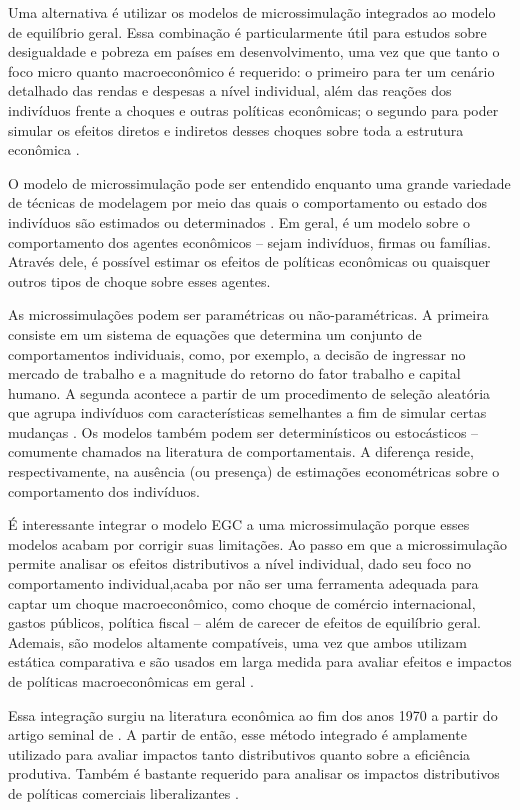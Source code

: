 Uma alternativa é utilizar os modelos de microssimulação integrados ao modelo de equilíbrio geral. Essa combinação é particularmente útil para estudos sobre desigualdade e pobreza em países em desenvolvimento, uma vez que que tanto o foco micro quanto macroeconômico é requerido: o primeiro para ter um cenário detalhado das rendas e despesas a nível individual, além das reações dos indivíduos frente a choques e outras políticas econômicas; o segundo para poder simular os efeitos diretos e indiretos desses choques sobre toda a estrutura econômica \cite{tiberti17, klevmarken22}.

O modelo de microssimulação pode ser entendido enquanto uma grande variedade de técnicas de modelagem por meio das quais o comportamento ou estado dos indivíduos são estimados ou determinados \cite{figari15}. Em geral, é um modelo sobre o comportamento dos agentes econômicos -- sejam indivíduos, firmas ou famílias. Através dele, é possível estimar os efeitos de políticas econômicas ou quaisquer outros tipos de choque sobre esses agentes.

As microssimulações podem ser paramétricas ou não-paramétricas. A primeira consiste em um sistema de equações que determina um conjunto de comportamentos individuais, como, por exemplo, a decisão de ingressar no mercado de trabalho e a magnitude do retorno do fator trabalho e capital humano. A segunda acontece a partir de um procedimento de seleção aleatória que agrupa indivíduos com características semelhantes a fim de simular certas mudanças \cite{tiberti17m}. Os modelos também podem ser determinísticos ou estocásticos -- comumente chamados na literatura de comportamentais. A diferença reside, respectivamente, na ausência (ou presença) de estimações econométricas sobre o comportamento dos indivíduos.

É interessante integrar o modelo EGC a uma microssimulação porque esses modelos acabam por corrigir suas limitações. Ao passo em que a microssimulação permite analisar os efeitos distributivos a nível individual, dado seu foco no comportamento individual,acaba por não ser uma ferramenta adequada para captar um choque macroeconômico, como choque de comércio internacional, gastos públicos, política fiscal -- além de carecer de efeitos de equilíbrio geral. Ademais, são modelos altamente compatíveis, uma vez que ambos utilizam estática comparativa e são usados em larga medida para avaliar efeitos e impactos de políticas macroeconômicas em geral \cite{tiberti17m}.

Essa integração surgiu na literatura econômica ao fim dos anos 1970 a partir do artigo seminal de \textcite{adelman78}. A partir de então, esse método integrado é amplamente utilizado para avaliar impactos tanto distributivos quanto sobre a eficiência produtiva. Também é bastante requerido para analisar os impactos distributivos de políticas comerciais liberalizantes \cite{carneiro06, ferreira06, raihan10, cicowiez16, mbanda21}.

